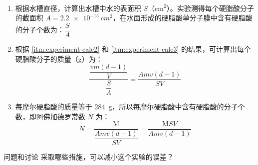 \begin{enumerate}[1.]
\begin{enumerate}[(1)]
    \[v(d-1)\cdot\frac{m}{V}=\frac{vm(d-1)}{V} \]
    \item \label{itm:experiment-calc3} 根据水槽直径，计算出水槽中水的表面积 $S$（\unit{cm^2}）。实验测得每个硬脂酸分子的截面积 $A=\qty{2.2e-15}{cm^2}$，在水面形成的硬脂酸单分子膜中含有硬脂酸的分子个数为：$\dfrac{S}{A}$
    \item 根据 \ref{itm:experiment-calc2} 和 \ref{itm:experiment-calc3} 的结果，可计算出每个硬脂酸分子的质量（\unit{g}）为：
    \[\frac{\dfrac{vm(d-1)}{V}}{\dfrac{S}{A}}=\frac{Amv(d-1)}{SV}\]
    \item 每摩尔硬脂酸的质量等于 \qty{284}{g}，所以每摩尔硬脂酸中含有硬脂酸的分子个数，即阿佛加德罗常数 $N$ 为：
    \[ N=\frac{\mathrm{M}}{\dfrac{Amv(d-1)}{SV}}=\frac{\mathrm{M}SV}{Amv(d-1)}\]
  \end{enumerate}
\end{enumerate}
\begin{Theorem}{问题和讨论}
  采取哪些措施，可以减小这个实验的误差？
\end{Theorem}